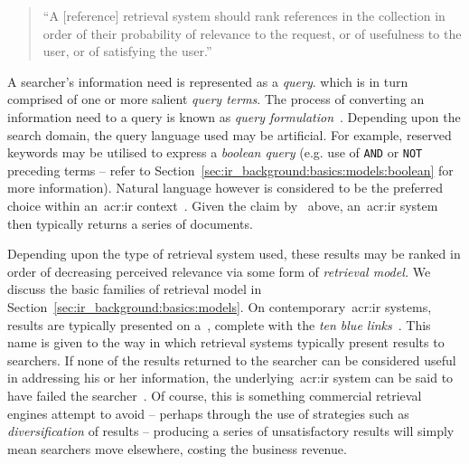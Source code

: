 \begin{quote}
    ``A [reference] retrieval system should rank references in the collection in order of their probability of relevance to the request, or of usefulness to the user, or of satisfying the user.''
\end{quote}

A searcher's information need is represented as a \emph{query}. which is in turn comprised of one or more salient \emph{query terms}. The process of converting an information need to a query is known as \emph{query formulation}~\citep{hiemstra2009ir_models}. Depending upon the search domain, the query language used may be artificial. For example, reserved keywords may be utilised to express a \emph{boolean query} (e.g. use of \texttt{AND} or \texttt{NOT} preceding terms -- refer to Section~\ref{sec:ir_background:basics:models:boolean} for more information). Natural language however is considered to be the preferred choice within an~\gls{acr:ir} context~\citep{rijsbergen1979ir}. Given the claim by~\cite{robertson1977prp} above, an~\gls{acr:ir} system then typically returns a series of documents.

Depending upon the type of retrieval system used, these results may be ranked in order of decreasing perceived relevance via some form of \emph{retrieval model.} We discuss the basic families of retrieval model in Section~\ref{sec:ir_background:basics:models}. On contemporary~\gls{acr:ir} systems, results are typically presented on a~, complete with the \emph{ten blue links}~\citep{hearst2009_search}. This name is given to the way in which retrieval systems typically present results to searchers. If none of the results returned to the searcher can be considered useful in addressing his or her information, the underlying~\gls{acr:ir} system can be said to have failed the searcher~\citep{rijsbergen1979ir}. Of course, this is something commercial retrieval engines attempt to avoid -- perhaps through the use of strategies such as \emph{diversification} of results -- producing a series of unsatisfactory results will simply mean searchers move elsewhere, costing the business revenue.

